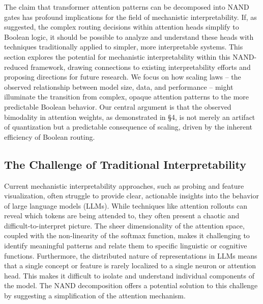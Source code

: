 The claim that transformer attention patterns can be decomposed into NAND gates has profound implications for the field of mechanistic interpretability. If, as suggested, the complex routing decisions within attention heads simplify to Boolean logic, it should be possible to analyze and understand these heads with techniques traditionally applied to simpler, more interpretable systems. This section explores the potential for mechanistic interpretability within this NAND-reduced framework, drawing connections to existing interpretability efforts and proposing directions for future research.  We focus on how scaling laws – the observed relationship between model size, data, and performance – might illuminate the transition from complex, opaque attention patterns to the more predictable Boolean behavior.  Our central argument is that the observed bimodality in attention weights, as demonstrated in §4, is not merely an artifact of quantization but a predictable consequence of scaling, driven by the inherent efficiency of Boolean routing.













\subsection{The Challenge of Traditional Interpretability}













Current mechanistic interpretability approaches, such as probing and feature visualization, often struggle to provide clear, actionable insights into the behavior of large language models (LLMs). While techniques like attention rollouts can reveal which tokens are being attended to, they often present a chaotic and difficult-to-interpret picture.  The sheer dimensionality of the attention space, coupled with the non-linearity of the softmax function, makes it challenging to identify meaningful patterns and relate them to specific linguistic or cognitive functions.  Furthermore, the distributed nature of representations in LLMs means that a single concept or feature is rarely localized to a single neuron or attention head.  This makes it difficult to isolate and understand individual components of the model. The NAND decomposition offers a potential solution to this challenge by suggesting a simplification of the attention mechanism.













